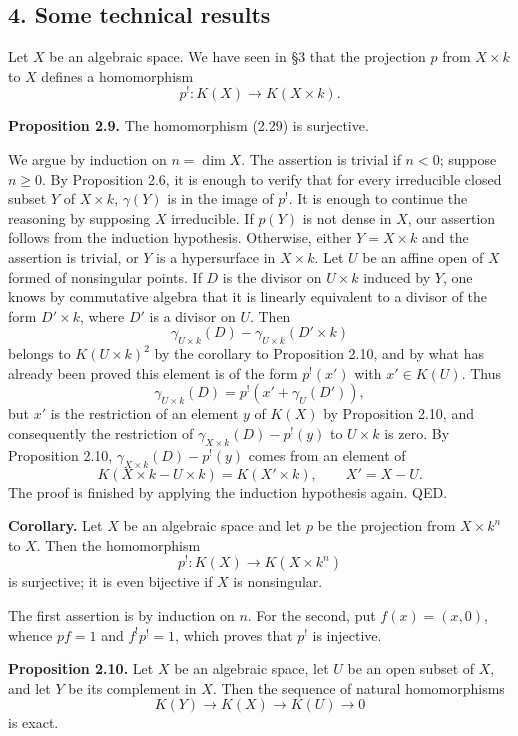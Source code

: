 \subsection*{4. Some technical results}

Let $X$ be an algebraic space. We have seen in \S 3 that the projection $p$ from $X\times k$ to $X$ defines a homomorphism
\begin{equation}\tag{2.29}
 p^!:K(X)\longrightarrow K(X\times k).
\end{equation}

\textbf{Proposition 2.9.} The homomorphism (2.29) is surjective.

We argue by induction on $n=\dim X$. The assertion is trivial if $n<0$; suppose $n\geq 0$. By Proposition 2.6, it is enough to verify that for every irreducible closed subset $Y$ of $X\times k$, $\gamma(Y)$ is in the image of $p^!$. It is enough to continue the reasoning by supposing $X$ irreducible. If $p(Y)$ is not dense in $X$, our assertion follows from the induction hypothesis. Otherwise, either $Y=X\times k$ and the assertion is trivial, or $Y$ is a hypersurface in $X\times k$. Let $U$ be an affine open of $X$ formed of nonsingular points. If $D$ is the divisor on $U\times k$ induced by $Y$, one knows by commutative algebra that it is linearly equivalent to a divisor of the form $D'\times k$, where $D'$ is a divisor on $U$. Then
\[
 \gamma_{U\times k}(D)-\gamma_{U\times k}(D'\times k)
\]
belongs to $K(U\times k)^2$ by the corollary to Proposition 2.10, and by what has already been proved this element is of the form $p^!(x')$ with $x'\in K(U)$. Thus
\[
 \gamma_{U\times k}(D)=p^!(x'+\gamma_U(D')),
\]
but $x'$ is the restriction of an element $y$ of $K(X)$ by Proposition 2.10, and consequently the restriction of $\gamma_{X\times k}(D)-p^!(y)$ to $U\times k$ is zero. By Proposition 2.10, $\gamma_{X\times k}(D)-p^!(y)$ comes from an element of
\[
 K(X\times k-U\times k)=K(X'\times k),\qquad X'=X-U.
\]
The proof is finished by applying the induction hypothesis again. QED.

\textbf{Corollary.} Let $X$ be an algebraic space and let $p$ be the projection from $X\times k^n$ to $X$. Then the homomorphism
\[
 p^!:K(X)\longrightarrow K(X\times k^n)
\]
is surjective; it is even bijective if $X$ is nonsingular.

The first assertion is by induction on $n$. For the second, put $f(x)=(x,0)$, whence $pf=1$ and $f^!p^!=1$, which proves that $p^!$ is injective.

\textbf{Proposition 2.10.} Let $X$ be an algebraic space, let $U$ be an open subset of $X$, and let $Y$ be its complement in $X$. Then the sequence of natural homomorphisms
\begin{equation}\tag{2.30}
 K(Y)\longrightarrow K(X)\longrightarrow K(U)\longrightarrow 0
\end{equation}
is exact.

